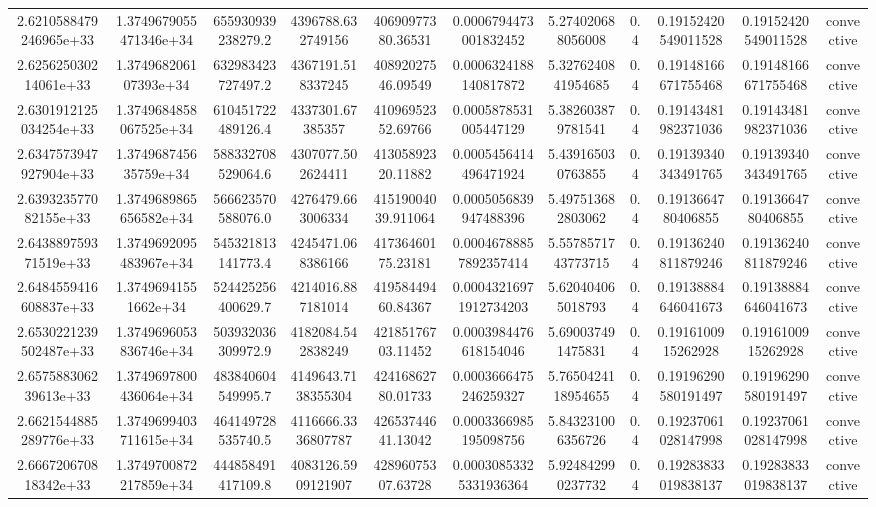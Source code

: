 \begin{table}
\begin{tabular}{ccccccccccc}
2.6210588479246965e+33 & 1.3749679055471346e+34 & 655930939238279.2 & 4396788.632749156 & 40690977380.36531 & 0.0006794473001832452 & 5.274020688056008 & 0.4 & 0.19152420549011528 & 0.19152420549011528 & convective \\
2.625625030214061e+33 & 1.374968206107393e+34 & 632983423727497.2 & 4367191.518337245 & 40892027546.09549 & 0.0006324188140817872 & 5.3276240841954685 & 0.4 & 0.19148166671755468 & 0.19148166671755468 & convective \\
2.6301912125034254e+33 & 1.3749684858067525e+34 & 610451722489126.4 & 4337301.67385357 & 41096952352.69766 & 0.0005878531005447129 & 5.382603879781541 & 0.4 & 0.19143481982371036 & 0.19143481982371036 & convective \\
2.6347573947927904e+33 & 1.374968745635759e+34 & 588332708529064.6 & 4307077.502624411 & 41305892320.11882 & 0.0005456414496471924 & 5.439165030763855 & 0.4 & 0.19139340343491765 & 0.19139340343491765 & convective \\
2.639323577082155e+33 & 1.3749689865656582e+34 & 566623570588076.0 & 4276479.663006334 & 41519004039.911064 & 0.0005056839947488396 & 5.497513682803062 & 0.4 & 0.1913664780406855 & 0.1913664780406855 & convective \\
2.643889759371519e+33 & 1.3749692095483967e+34 & 545321813141773.4 & 4245471.068386166 & 41736460175.23181 & 0.00046788857892357414 & 5.5578571743773715 & 0.4 & 0.19136240811879246 & 0.19136240811879246 & convective \\
2.6484559416608837e+33 & 1.37496941551662e+34 & 524425256400629.7 & 4214016.887181014 & 41958449460.84367 & 0.00043216971912734203 & 5.620404065018793 & 0.4 & 0.19138884646041673 & 0.19138884646041673 & convective \\
2.6530221239502487e+33 & 1.3749696053836746e+34 & 503932036309972.9 & 4182084.542838249 & 42185176703.11452 & 0.0003984476618154046 & 5.690037491475831 & 0.4 & 0.1916100915262928 & 0.1916100915262928 & convective \\
2.657588306239613e+33 & 1.3749697800436064e+34 & 483840604549995.7 & 4149643.7138355304 & 42416862780.01733 & 0.0003666475246259327 & 5.7650424118954655 & 0.4 & 0.19196290580191497 & 0.19196290580191497 & convective \\
2.6621544885289776e+33 & 1.3749699403711615e+34 & 464149728535740.5 & 4116666.3336807787 & 42653744641.13042 & 0.0003366985195098756 & 5.843231006356726 & 0.4 & 0.19237061028147998 & 0.19237061028147998 & convective \\
2.666720670818342e+33 & 1.3749700872217859e+34 & 444858491417109.8 & 4083126.5909121907 & 42896075307.63728 & 0.00030853325331936364 & 5.924842990237732 & 0.4 & 0.19283833019838137 & 0.19283833019838137 & convective \\

\end{tabular}
\end{table}
